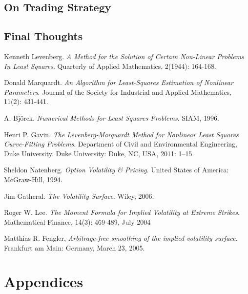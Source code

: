 \documentclass[12pt, a4paper, notitlepage]{article}
\numberwithin{equation}{subsection}
\numberwithin{figure}{subsection}
\numberwithin{table}{subsection}
\begin{document}
\subsection{On Trading Strategy}


\subsection{Final Thoughts}

\begin{thebibliography}{3}
	
    	Kenneth Levenberg.
        \textit{A Method for the Solution of Certain Non-Linear Problems In Least Squares}.
        Quarterly of Applied Mathematics, 2(1944): 164-168.
    
    	Donald Marquardt.
        \textit{An Algorithm for Least-Squares Estimation of Nonlinear Parameters}.  Journal of the Society for Industrial and Applied Mathematics, 11(2): 431-441.
    
        A. Bj\"orck.  \textit{Numerical Methods for Least Squares Problems}.
        SIAM, 1996.
        
        Henri P. Gavin.
        \textit{The Levenberg-Marquardt Method for Nonlinear Least Squares Curve-Fitting Problems}.
        Department of Civil and Environmental Engineering, Duke University.
        Duke University: Duke, NC, USA, 2011: 1–15.
    
    	Sheldon Natenberg.
        \textit{Option Volatility \& Pricing}.
        United States of America:  McGraw-Hill, 1994.
    
    	Jim Gatheral.
        \textit{The Volatility Surface}.
        Wiley, 2006.
    
    	Roger W. Lee.
        \textit{The Moment Formula for Implied Volatility at Extreme Strikes}.
        Mathematical Finance, 14(3): 469-489, July 2004
    
	  Matthias R. Fengler,
	  \textit{Arbitrage-free smoothing of the implied volatility surface}.
	  Frankfurt am Main: Germany,
	  March 23, 2005.
	  

\end{thebibliography}

\newpage
\section{Appendices} \label{Appendicies}
\end{document}
